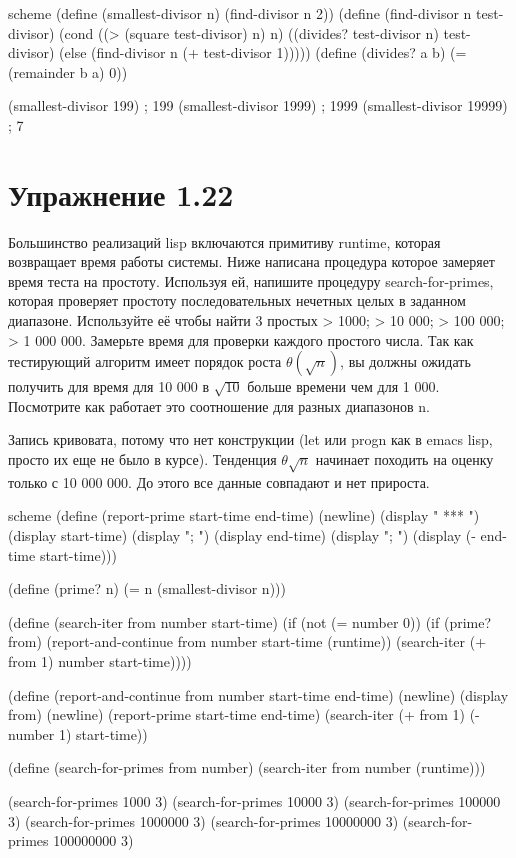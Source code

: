\begin{codelisting}{scheme}
(define (smallest-divisor n)
  (find-divisor n 2))
(define (find-divisor n test-divisor)
  (cond ((> (square test-divisor) n) n)
        ((divides? test-divisor n) test-divisor)
        (else (find-divisor n (+ test-divisor 1)))))
(define (divides? a b)
  (= (remainder b a) 0))

(smallest-divisor 199) ; 199
(smallest-divisor 1999) ; 1999
(smallest-divisor 19999) ; 7
\end{codelisting}

\chapter{Упражнение 1.22}

Большинство реализаций lisp включаются примитиву runtime, которая возвращает время работы системы. Ниже написана процедура которое замеряет время теста на простоту. Используя ей, напишите процедуру search-for-primes, которая проверяет простоту последовательных нечетных целых в заданном диапазоне. Используйте её чтобы найти 3 простых > 1000; > 10 000; > 100 000; > 1 000 000. Замерьте время для проверки каждого простого числа. Так как тестирующий алгоритм имеет порядок роста $\theta(\sqrt{n})$, вы должны ожидать получить для время для 10 000 в $\sqrt{10}$ больше времени чем для 1 000. Посмотрите как работает это соотношение для разных диапазонов n.


Запись кривовата, потому что нет конструкции (let или progn как в emacs lisp, просто их еще не было в курсе). Тенденция $\theta{\sqrt{n}}$ начинает походить на оценку только с 10 000 000. До этого все данные совпадают и нет прироста.

\begin{codelisting}{scheme}
(define (report-prime start-time end-time)
  (newline)
  (display " *** ")
  (display start-time)
  (display "; ")
  (display end-time)
  (display "; ")
  (display (- end-time start-time)))

(define (prime? n)
  (= n (smallest-divisor n)))

(define (search-iter from number start-time)
  (if (not (= number 0))
      (if (prime? from)
          (report-and-continue from number start-time (runtime))
          (search-iter (+ from 1) number start-time))))

(define (report-and-continue from number start-time end-time)
  (newline)
  (display from)
  (newline)
  (report-prime start-time end-time)
  (search-iter (+ from 1) (- number 1) start-time))

(define (search-for-primes from number)
  (search-iter from number (runtime)))

(search-for-primes 1000 3)
(search-for-primes 10000 3)
(search-for-primes 100000 3)
(search-for-primes 1000000 3)
(search-for-primes 10000000 3)
(search-for-primes 100000000 3)
\end{codelisting}


